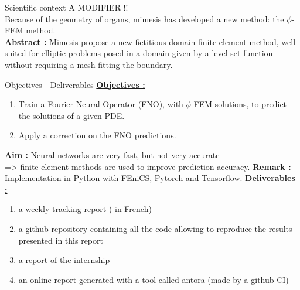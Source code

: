 \documentclass[compress,10pt,xcolor={table,dvipsnames},t]{beamer}
\begin{document}
	\begin{frame}{Scientific context}
		\color{red}A MODIFIER !!\color{black} \\
		Because of the geometry of organs, mimesis has developed a new method: the $\phi$-FEM method. \\
		\textbf{Abstract :} Mimesis propose a new fictitious domain finite element method, well suited for elliptic problems posed
		in a domain given by a level-set function without requiring a mesh fitting the boundary. 
		\begin{center}
		\end{center}
	\end{frame}

	\begin{frame}{Objectives - Deliverables}
		\underline{\textbf{Objectives :}} \\
		\begin{enumerate}[\ding{217}]
			\item Train a Fourier Neural Operator (FNO), with $\phi$-FEM solutions, to predict the solutions of a given PDE.
			\item Apply a correction on the FNO predictions.
		\end{enumerate}
		\textbf{Aim :} Neural networks are very fast, but not very accurate \\
		=> finite element methods are used to improve prediction accuracy.
		\textbf{Remark :} Implementation in Python with FEniCS, Pytorch and Tensorflow.
		\underline{\textbf{Deliverables :}}

		\begin{enumerate}[\ding{217}]
			\item a \href{https://github.com/flecourtier/phifem_stage/blob/main/docs/suivi/suivi.pdf}{weekly tracking report} ( in French)
			\item a \href{https://github.com/flecourtier/phifem_stage}{github repository} containing all the code allowing to reproduce the results presented in this report
			\item a \href{https://csmi.cemosis.fr/csmi-stages-2023/m2/_attachments/Lecourtier-Fr\%C3\%A9d\%C3\%A9rique.pdf}{report} of the internship
			\item an \href{https://flecourtier.github.io/phifem_stage/phifem_project/1.0.3/main_page.html}{online report} generated with a tool called antora (made by a github CI)
		\end{enumerate}
	\end{frame}
\end{document}
